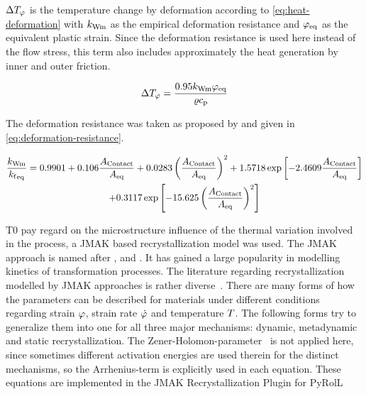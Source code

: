 \noindent$\Delta{T}_{{\varphi}}$ is the temperature change by deformation according to \autoref{eq:heat-deformation} with ${k_\mathrm{Wm}}$ as the empirical deformation resistance and ${{{\varphi}}_\mathrm{eq}}$ as the equivalent plastic strain.
Since the deformation resistance is used here instead of the flow stress, this term also includes approximately the heat generation by inner and outer friction.

\begin{equation}
    \Delta{T}_{{\varphi}} = \frac{\num{0.95} {k_\mathrm{Wm}} {{{\varphi}}_\mathrm{eq}}}{{\varrho}{c_\mathrm{p}}}
    \label{eq:heat-deformation}
\end{equation}

The deformation resistance was taken as proposed by \textcite{Hensel1978} and given in \autoref{eq:deformation-resistance}.

\begin{multline}
    \frac{{k_\mathrm{Wm}}}{{{{k_\mathrm{f}}}_\mathrm{eq}}} = \num{0.9901} + \num{0.106} \frac{{{A}_\mathrm{Contact}}}{{{{A}}_\mathrm{eq}}} + \num{0.0283} \left( \frac{{{A}_\mathrm{Contact}}}{{{{A}}_\mathrm{eq}}} \right)^2 + \num{1.5718} \exp \left[ \num{-2.4609} \frac{{{A}_\mathrm{Contact}}}{{{{A}}_\mathrm{eq}}} \right] \\
    + \num{0.3117} \exp \left[ \num{-15.625} \left( \frac{{{A}_\mathrm{Contact}}}{{{{A}}_\mathrm{eq}}} \right)^2 \right]
    \label{eq:deformation-resistance}
\end{multline}

T0 pay regard on the microstructure influence of the thermal variation involved in the process, a JMAK based recrystallization model was used.
The JMAK approach is named after \textcite{Johnson1939}, \textcite{Avrami1939, Avrami1940, Avrami1941} and \textcite{Kolmogorov1937}.
It has gained a large popularity in modelling kinetics of transformation processes.
The literature regarding recrystallization modelled by JMAK approaches is rather diverse~\cite{Luton1969, Sellars1978, Sellars1979, Sellars1985, Beynon1992, Glover1972, Glover1973, Hodgson1992, Laasraoui1991, Laasraoui1991a, Hernandez1996, Medina1996, Fernandez2000, Fernandez2003, Karhausen1992,Roberts1979, Maccagno1996, Siciliano2000}.
There are many forms of how the parameters can be described for materials under different conditions regarding strain ${\varphi}$, strain rate ${\dot{\varphi}}$ and temperature ${T}$.
The following forms try to generalize them into one for all three major mechanisms: dynamic, metadynamic and static recrystallization.
The Zener-Holomon-parameter~\cite{Zener1944} is not applied here, since sometimes different activation energies are used therein for the distinct mechanisms, so the Arrhenius-term is explicitly used in each equation.
These equations are implemented in the JMAK Recrystallization Plugin for PyRolL~\cite{pyroll-jmak-recrystallization}

